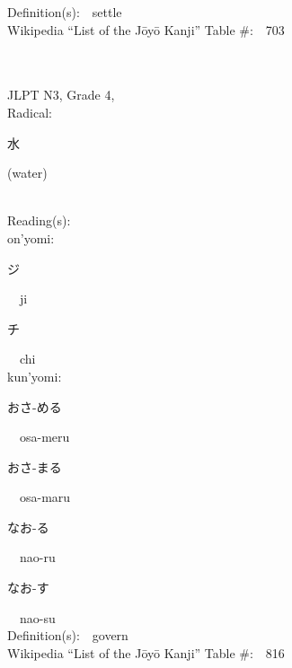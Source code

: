 \begin{multicols}{2}
Definition(s):\ \ settle \\
Wikipedia ``List of the J\=oy\=o Kanji'' Table \#:\ \ 703 \\
\ \ \\
{\fontsize{34pt}{40pt}  }\ \ \\  %
{JLPT N3, Grade 4, \\Radical:\ \ {\begin{CJK}{UTF8}{min} 水 \end{CJK}} (water) } \\
Reading(s):\ \ \\
{\hspace*{1em}}on'yomi:\ \ \\
{\hspace*{2em}}{\begin{CJK}{UTF8}{min} ジ \end{CJK}}\ \ ji\ \ \\
{\hspace*{2em}}{\begin{CJK}{UTF8}{min} チ \end{CJK}}\ \ chi\ \ \\
{\hspace*{1em}}kun'yomi:\ \ \\
{\hspace*{2em}}{\begin{CJK}{UTF8}{min} おさ-める \end{CJK}}\ \ osa-meru\ \ \\
{\hspace*{2em}}{\begin{CJK}{UTF8}{min} おさ-まる \end{CJK}}\ \ osa-maru\ \ \\
{\hspace*{2em}}{\begin{CJK}{UTF8}{min} なお-る \end{CJK}}\ \ nao-ru\ \ \\
{\hspace*{2em}}{\begin{CJK}{UTF8}{min} なお-す \end{CJK}}\ \ nao-su\ \ \\
Definition(s):\ \ govern \\
Wikipedia ``List of the J\=oy\=o Kanji'' Table \#:\ \ 816 \\
\ \ \\

\end{multicols}
